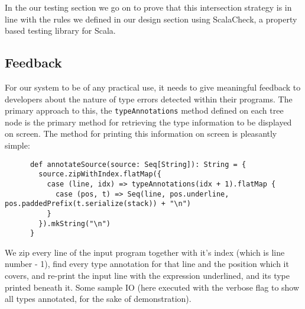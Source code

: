 \documentclass[british, twoside, openright]{bhamthesis}
\theoremstyle{definition}
\begin{document}
      In the our testing section we go on to prove that this intersection strategy is in line with the rules we defined in our design section using ScalaCheck, a property based testing library for Scala.

      \subsection{Feedback}

      For our system to be of any practical use, it needs to give meaningful feedback to developers about the nature of type errors detected within their programs. The primary approach to this, the \texttt{typeAnnotations} method defined on each tree node is the primary method for retrieving the type information to be displayed on screen. The method for printing this information on screen is pleasantly simple:

      \begin{lstlisting}
      def annotateSource(source: Seq[String]): String = {
        source.zipWithIndex.flatMap({
          case (line, idx) => typeAnnotations(idx + 1).flatMap {
            case (pos, t) => Seq(line, pos.underline, pos.paddedPrefix(t.serialize(stack)) + "\n")
          }
        }).mkString("\n")
      }
      \end{lstlisting}

      We zip every line of the input program together with it's index (which is line number - 1), find every type annotation for that line and the position which it covers, and re-print the input line with the expression underlined, and its type printed beneath it. Some sample IO (here executed with the verbose flag to show all types annotated, for the sake of demonstration).
\end{document}
